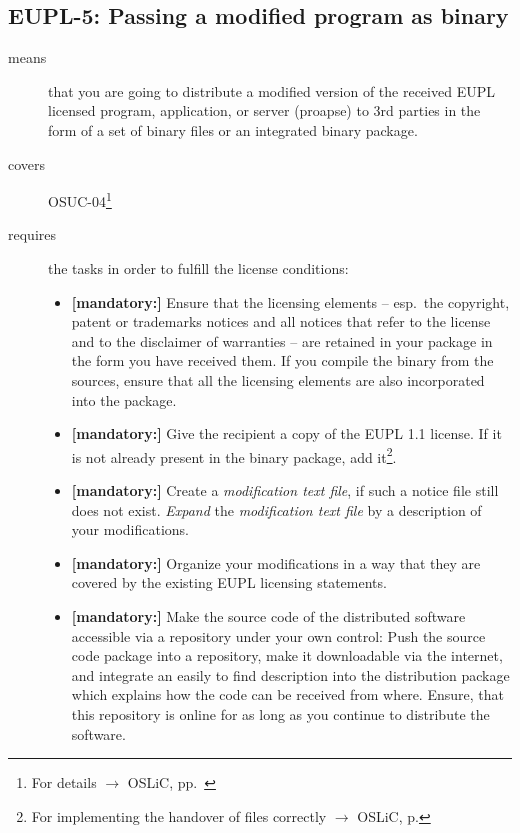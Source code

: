 \subsection{EUPL-5: Passing a modified program as binary}

\begin{description}
\item[means] that you are going to distribute a modified version of the received
EUPL licensed pro\-gram, application, or server (proapse) to 3rd parties in
the form of a set of binary files or an integrated binary package.
\item[covers] OSUC-04\footnote{For details $\rightarrow$ OSLiC, pp.\ \pageref{OSUC-04-DEF}}
\item[requires] the tasks in order to fulfill the license conditions:
\begin{itemize}

  \item \textbf{[mandatory:]} Ensure that the licensing elements -- esp.\ the
  copyright, patent or trademarks notices and all notices that refer to the
  license and to the disclaimer of warranties -- are retained in your package in
  the form you have received them. If you compile the binary from the sources,
  ensure that all the licensing elements are also incorporated into the package.

 \item \textbf{[mandatory:]} Give the recipient a copy of the EUPL 1.1
  license. If it is not already present in the binary package, add
  it\footnote{For implementing the handover of files correctly $\rightarrow$
  OSLiC, p. \pageref{DistributingFilesHint}}.
  
  \item \textbf{[mandatory:]} Create a \emph{modification text file}, if such a
  notice file still does not exist. \emph{Expand} the \emph{modification text
  file} by a description of your modifications.

  \item \textbf{[mandatory:]} Organize your modifications in a way that they are
  covered by the existing EUPL licensing statements.
  
  \item \textbf{[mandatory:]} Make the source code of the distributed software
  accessible via a repository under your own control: Push the source code
  package into a repository, make it downloadable via the internet, and
  integrate an easily to find description into the distribution package which
  explains how the code can be received from where. Ensure, that this repository
  is online for as long as you continue to distribute the software.
  

\end{itemize}
\end{description}
